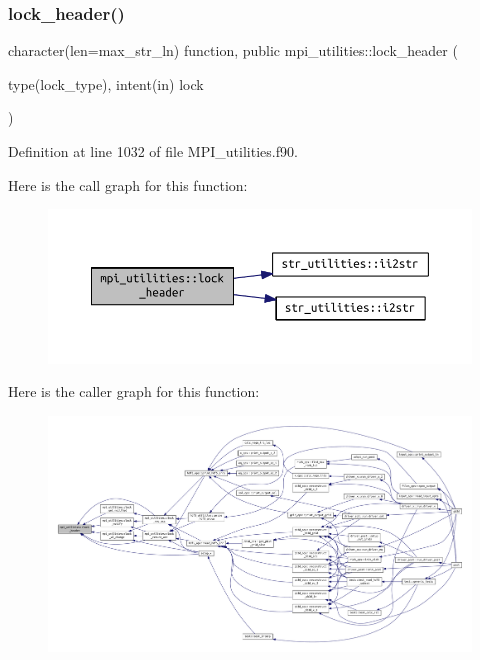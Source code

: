 \subsubsection{\texorpdfstring{lock\+\_\+header()}{lock\_header()}}
{\footnotesize\ttfamily character(len=max\+\_\+str\+\_\+ln) function, public mpi\+\_\+utilities\+::lock\+\_\+header (\begin{DoxyParamCaption}\item[{type(lock\+\_\+type), intent(in)}]{lock }\end{DoxyParamCaption})}



Definition at line 1032 of file M\+P\+I\+\_\+utilities.\+f90.

Here is the call graph for this function\+:
\nopagebreak
\begin{figure}[H]
\begin{center}
\leavevmode
\includegraphics[width=350pt]{namespacempi__utilities_a4c5de9472574b63c69212948d8a3f4e1_cgraph}
\end{center}
\end{figure}
Here is the caller graph for this function\+:
\nopagebreak
\begin{figure}[H]
\begin{center}
\leavevmode
\includegraphics[width=350pt]{namespacempi__utilities_a4c5de9472574b63c69212948d8a3f4e1_icgraph}
\end{center}
\end{figure}
\mbox{\label{namespacempi__utilities_a5d2dbf8ffba124237c362f06c3d3ac32}} 
